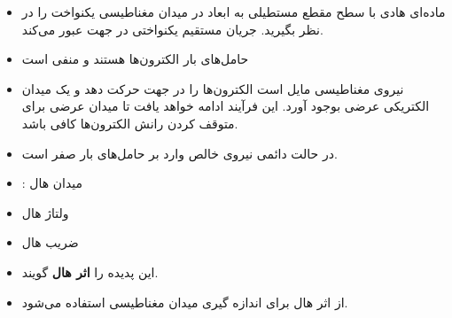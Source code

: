 \begin{ELunit}

\begin{itemize}
\tightlist
\item
  ماده‌ای هادی با سطح مقطع مستطیلی به ابعاد  در میدان مغناطیسی یکنواخت  را در نظر بگیرید. جریان مستقیم یکنواختی در جهت  عبور می‌کند.
\end{itemize}



\begin{itemize}
\tightlist
\item
  حامل‌های بار الکترون‌ها هستند و  منفی است
\end{itemize}


\begin{itemize}
\tightlist
\item
  نیروی مغناطیسی مایل است الکترون‌ها را در جهت  حرکت دهد و یک میدان الکتریکی عرضی بوجود آورد. این فرآیند ادامه خواهد یافت تا میدان عرضی برای متوقف کردن رانش الکترون‌ها کافی باشد.
\item
  در حالت دائمی نیروی خالص وارد بر حامل‌های بار صفر است.
\end{itemize}


\begin{itemize}
\tightlist
\item
  : میدان هال
\item
  ولتاژ هال
\end{itemize}


\begin{itemize}
\tightlist
\item
  ضریب هال
\end{itemize}


\begin{itemize}
\tightlist
\item
  این پدیده را \textbf{اثر هال} گویند.
\item
  از اثر هال برای اندازه گیری میدان مغناطیسی استفاده می‌شود.
\end{itemize}

\end{ELunit}

